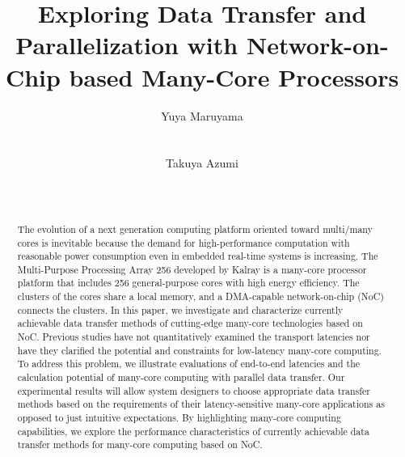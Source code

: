 \documentclass{sig-alternate-05-2015}
\author{
\alignauthor Yuya Maruyama\\
\affaddr{Graduate School of Engineering Science}\\
\affaddr{Osaka University}\\
\alignauthor Takuya Azumi\\
\affaddr{Graduate School of Engineering Science}\\
\affaddr{Osaka University}\\
}
\title{Exploring Data Transfer and Parallelization with Network-on-Chip based Many-Core Processors}
\begin{document}

\maketitle

\setcounter{topnumber}{5}%
\def\topfraction{1.00}%
\setcounter{bottomnumber}{5}%
\def\bottomfraction{1.00}%
\setcounter{totalnumber}{10}%
\def\textfraction{0.00}%


\begin{abstract}
The evolution of a next generation computing platform oriented toward multi/many cores is inevitable because the demand for high-performance computation with reasonable power consumption even in embedded real-time systems is increasing.
The Multi-Purpose Processing Array 256 developed by Kalray is a many-core processor platform that includes 256 general-purpose cores with high energy efficiency.
The clusters of the cores share a local memory, and a DMA-capable network-on-chip (NoC) connects the clusters.
In this paper, we investigate and characterize currently achievable data transfer methods of cutting-edge many-core technologies based on NoC.
Previous studies have not quantitatively examined the transport latencies nor have they clarified the potential and constraints for low-latency many-core computing.
To address this problem, we illustrate evaluations of end-to-end latencies and the calculation potential of many-core computing with parallel data transfer.
Our experimental results will allow system designers to choose appropriate data transfer methods based on the requirements of their latency-sensitive many-core applications as opposed to just intuitive expectations.
By highlighting many-core computing capabilities, we explore the performance characteristics of currently achievable data transfer methods for many-core computing based on NoC.
\end{abstract}
\end{document}
